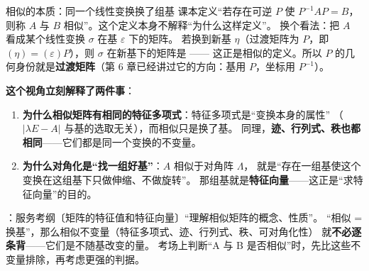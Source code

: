 





\begin{fdeep}{相似的本质：同一个线性变换换了组基}
课本定义“若存在可逆 $P$ 使 $P^{-1}AP=B$，则称 $A$ 与 $B$ 相似”。这个定义本身不解释“为什么这样定义”。
换个看法：把 $A$ 看成某个线性变换 $\sigma$ 在基 $\varepsilon$ 下的矩阵。
若换到新基 $\eta$（过渡矩阵为 $P$，即 $(\eta)=(\varepsilon)P$），则 $\sigma$ 在新基下的矩阵是
—— 这正是相似的定义。所以
$P$ 的几何身份就是\textbf{过渡矩阵}（第 6 章已经讲过它的方向：基用 $P$，坐标用 $P^{-1}$）。

\textbf{这个视角立刻解释了两件事}：
\begin{enumerate}[leftmargin=2.2em,itemsep=0.22em]
\item \textbf{为什么相似矩阵有相同的特征多项式}：特征多项式是“变换本身的属性”
      （$\lvert\lambda E-A\rvert$ 与基的选取无关），而相似只是换了基。
      同理，\textbf{迹、行列式、秩也都相同}——它们都是同一个变换的不变量。
\item \textbf{为什么对角化是“找一组好基”}：$A$ 相似于对角阵 $\Lambda$，
      就是“存在一组基使这个变换在这组基下只做伸缩、不做旋转”。
      那组基就是\textbf{特征向量}——这正是“求特征向量”的目的。
\end{enumerate}
\fbref{}：服务考纲〔矩阵的特征值和特征向量〕“理解相似矩阵的概念、性质”。
“相似 = 换基”，那么相似不变量（特征多项式、迹、行列式、秩、可对角化性）
就\textbf{不必逐条背}——它们是不随基改变的量。
考场上判断“A 与 B 是否相似”时，先比这些不变量排除，再考虑更强的判据。
\end{fdeep}

